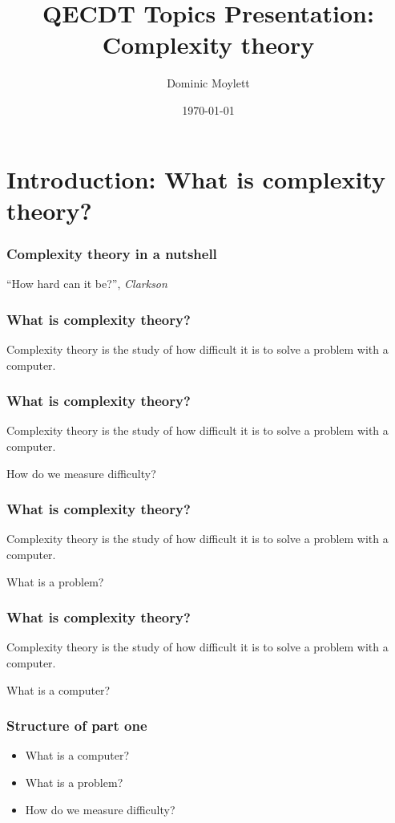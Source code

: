 \documentclass[aspectratio=169]{beamer}
\title[Complexity theory]{QECDT Topics Presentation: Complexity theory} %
\author{Dominic Moylett} %
\institute[University of Bristol] %
{
University of Bristol \\ %
\medskip
\textit{dominic.moylett@bristol.ac.uk} %
}
\date{\today} %
\begin{document}
\begin{frame}
\titlepage %
\end{frame}


\section{Introduction: What is complexity theory?}

\begin{frame}
\frametitle{Complexity theory in a nutshell}
\centerline{``How hard can it be?'', {\em Clarkson}}
\end{frame}

\begin{frame}
\frametitle{What is complexity theory?}
Complexity theory is the study of how difficult it is to solve a problem with a computer.
\end{frame}

\begin{frame}
\frametitle{What is complexity theory?}
Complexity theory is the study of how {\color{red} difficult} it is to solve a problem with a computer.

How do we measure difficulty?
\end{frame}

\begin{frame}
\frametitle{What is complexity theory?}
Complexity theory is the study of how difficult it is to solve a {\color{red} problem} with a computer.

What is a problem?
\end{frame}

\begin{frame}
\frametitle{What is complexity theory?}
Complexity theory is the study of how difficult it is to solve a problem with a {\color{red} computer}.

What is a computer?
\end{frame}

\begin{frame}
\frametitle{Structure of part one}
\begin{itemize}
    \item What is a computer?
    \item What is a problem?
    \item How do we measure difficulty?
\end{itemize}
\end{frame}
\end{document}
